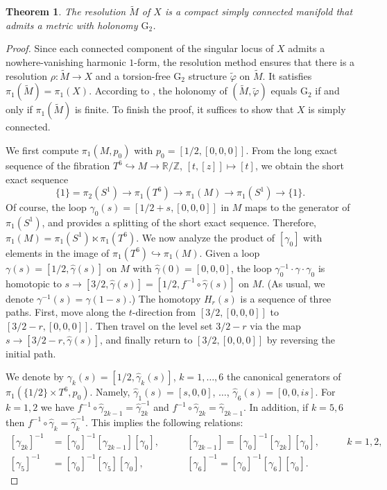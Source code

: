 \documentclass[10pt]{article}
\newcommand{\g}{\gamma}
\newcommand{\R}{\mathbb R}
\newcommand{\Z}{\mathbb Z}
\newcommand{\Gtwo}{\mathrm{G}_2}
\theoremstyle{plain}
\newtheorem{theorem}[proposition]{Theorem}
\theoremstyle{definition}
\theoremstyle{remark}
\begin{document}
\begin{theorem}
The resolution $\widetilde{M}$ of $X$ is a compact simply connected manifold that 
admits a metric with holonomy $\Gtwo$.
\end{theorem}
\begin{proof}
Since each connected component of the singular locus of $X$ admits a nowhere-vanishing harmonic $1$-form, the resolution method  \cite[Theorem 1.1]{JK}
ensures that there
is a resolution $\rho \colon \widetilde{M} \to X$ and a torsion-free $\Gtwo$ structure $\widetilde{\varphi}$ on $\widetilde{M}$. It satisfies $\pi_1(\widetilde{M})=\pi_1(X)$. According to \cite[Proposition 10.2.2]{Joyce2}, the holonomy of $(\widetilde{M},\widetilde{\varphi})$ equals $\Gtwo$ if and only if $\pi_1(\widetilde{M})$ is finite. To finish the proof, it suffices to show that $X$ is simply connected.


We first compute $\pi_1(M,p_0)$ with $p_0=[1/2,[0,0,0]]$. From the long exact sequence of the fibration $T^6 \hookrightarrow M \to \R/\Z$, $[t,[z]]\longmapsto [t]$, we obtain the short exact sequence
$$
\{1\} =\pi_2(S^1) \to \pi_1(T^6) \to \pi_1(M) \to \pi_1(S^1) \to \{1\}.
$$
Of course, the loop ${\g}_0(s)= [1/2+s,[0,0,0]]$ in $M$  maps to the generator of $\pi_1(S^1)$, and provides a splitting of the short exact sequence. Therefore, $\pi_1(M)=\pi_1(S^1) \ltimes \pi_1(T^6)$. We now analyze the product of $[\gamma_0]$ with elements in the image of $\pi_1(T^6) \hookrightarrow \pi_1(M)$. Given a loop $\gamma(s)=[1/2,\widehat{\gamma}(s)]$ on $M$ with $\widehat{\gamma}(0)=[0,0,0]$, the loop $\g_0^{-1} \cdot \gamma \cdot \g_0$ is homotopic to 
$s \to [3/2,\widehat{\gamma}(s)]=[1/2,f^{-1} \circ \widehat{\gamma}(s)]$ on $M$. (As usual, we denote $\gamma^{-1}(s)=\gamma(1-s)$.)
The homotopy $H_{r}(s)$ is a sequence of three paths. First, move along the $t$-direction from $[3/2,[0,0,0]]$ to $[3/2-r,[0,0,0]]$. Then travel on the level set $3/2-r$ via the map $s\to  [3/2-r,\widehat{\gamma}(s)]$, and finally return to $[3/2,[0,0,0]]$ by reversing the initial path. 

We denote by $\g_k(s)=[1/2,\widehat{\gamma}_k(s)]$, $k=1,\dots,6$ the canonical generators of $\pi_1(\{1/2\}\times T^6,p_0)$. Namely, $\widehat{\gamma}_1(s)=[s,0,0]$, $\dots$, $\widehat{\gamma}_6(s)=[0,0,is]$. For $k=1,2$ we have
$f^{-1}\circ \widehat{\gamma}_{2k-1}=\widehat{\gamma}_{2k}^{-1}$ and $f^{-1}\circ \widehat{\gamma}_{2k}=\widehat{\gamma}_{2k-1}$. In addition, if $k=5,6$ then $f^{-1}\circ \widehat{\gamma}_{k}=\widehat{\gamma}_k^{-1}$. This implies the following relations:
\begin{align}
 \label{eqn:rel-fund-1}
[{\g}_{2k}]^{-1}&=[{\g}_0]^{-1}[ {\g}_{2k-1}][{\g}_0],\qquad
&[{\g}_{2k-1}]=[{\g}_0]^{-1}[{\g}_{2k}][{\g}_0], &\qquad k=1,2, \\
\label{eqn:rel-fund-2}
[{\g}_{5}]^{-1}&=[{\g}_0]^{-1}[ {\g}_{5}] [{\g}_0],\qquad
&[{\g}_{6}]^{-1}=[{\g}_0]^{-1}[{\g}_{6}][{\g}_0].\quad &
\end{align}


\end{proof}
\end{document}
